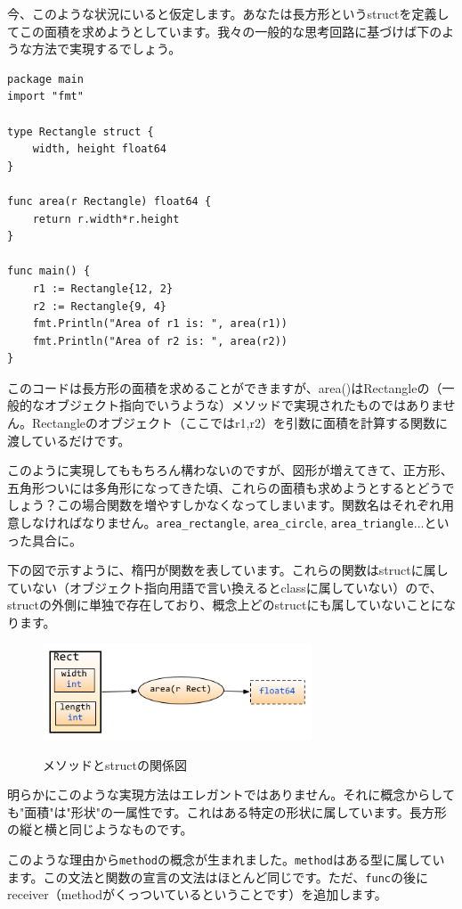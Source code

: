 今、このような状況にいると仮定します。あなたは長方形というstructを定義してこの面積を求めようとしています。我々の一般的な思考回路に基づけば下のような方法で実現するでしょう。


\begin{lstlisting}[numbers=none]
package main
import "fmt"

type Rectangle struct {
    width, height float64
}

func area(r Rectangle) float64 {
    return r.width*r.height
}

func main() {
    r1 := Rectangle{12, 2}
    r2 := Rectangle{9, 4}
    fmt.Println("Area of r1 is: ", area(r1))
    fmt.Println("Area of r2 is: ", area(r2))
}
\end{lstlisting}

このコードは長方形の面積を求めることができますが、area()はRectangleの（一般的なオブジェクト指向でいうような）メソッドで実現されたものではありません。Rectangleのオブジェクト（ここではr1,r2）を引数に面積を計算する関数に渡しているだけです。

このように実現してももちろん構わないのですが、図形が増えてきて、正方形、五角形ついには多角形になってきた頃、これらの面積も求めようとするとどうでしょう？この場合関数を増やすしかなくなってしまいます。関数名はそれぞれ用意しなければなりません。\texttt{area\_rectangle}, \texttt{area\_circle}, \texttt{area\_triangle}...といった具合に。

下の図で示すように、楕円が関数を表しています。これらの関数はstructに属していない（オブジェクト指向用語で言い換えるとclassに属していない）ので、structの外側に単独で存在しており、概念上どのstructにも属していないことになります。

\begin{figure}[H]
  \includegraphics[width=8cm]{2.5.rect_func_without_receiver.png}
   \label{図2.8}
   \caption{メソッドとstructの関係図}
\end{figure}

明らかにこのような実現方法はエレガントではありません。それに概念からしても"面積"は"形状"の一属性です。これはある特定の形状に属しています。長方形の縦と横と同じようなものです。

このような理由から\texttt{method}の概念が生まれました。\texttt{method}はある型に属しています。この文法と関数の宣言の文法はほとんど同じです。ただ、\texttt{func}の後にreceiver（methodがくっついているということです）を追加します。

